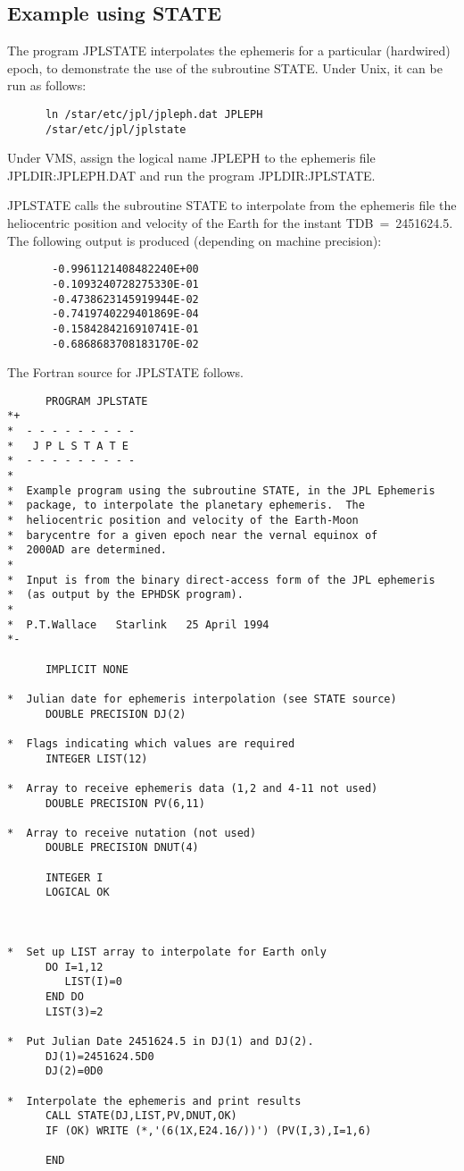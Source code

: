 \subsection{Example using STATE}
The program JPLSTATE interpolates the ephemeris for a
particular (hardwired) epoch, to demonstrate
the use of the subroutine STATE.  Under Unix, it can be run as
follows:
\begin{verbatim}
      ln /star/etc/jpl/jpleph.dat JPLEPH
      /star/etc/jpl/jplstate
\end{verbatim}
Under VMS, assign the logical name JPLEPH to the
ephemeris file JPLDIR:JPLEPH.DAT
and run the program JPLDIR:JPLSTATE.

JPLSTATE calls the subroutine STATE to interpolate from the ephemeris file the
heliocentric position and velocity of the Earth for the instant
TDB~=~2451624.5. The following output is produced (depending on
machine precision):

\begin{verbatim}
       -0.9961121408482240E+00
       -0.1093240728275330E-01
       -0.4738623145919944E-02
       -0.7419740229401869E-04
       -0.1584284216910741E-01
       -0.6868683708183170E-02
\end{verbatim}
The Fortran source for JPLSTATE follows.

\begin{verbatim}
      PROGRAM JPLSTATE
*+
*  - - - - - - - - -
*   J P L S T A T E
*  - - - - - - - - -
*
*  Example program using the subroutine STATE, in the JPL Ephemeris
*  package, to interpolate the planetary ephemeris.  The
*  heliocentric position and velocity of the Earth-Moon
*  barycentre for a given epoch near the vernal equinox of
*  2000AD are determined.
*
*  Input is from the binary direct-access form of the JPL ephemeris
*  (as output by the EPHDSK program).
*
*  P.T.Wallace   Starlink   25 April 1994
*-

      IMPLICIT NONE

*  Julian date for ephemeris interpolation (see STATE source)
      DOUBLE PRECISION DJ(2)

*  Flags indicating which values are required
      INTEGER LIST(12)

*  Array to receive ephemeris data (1,2 and 4-11 not used)
      DOUBLE PRECISION PV(6,11)

*  Array to receive nutation (not used)
      DOUBLE PRECISION DNUT(4)

      INTEGER I
      LOGICAL OK



*  Set up LIST array to interpolate for Earth only
      DO I=1,12
         LIST(I)=0
      END DO
      LIST(3)=2

*  Put Julian Date 2451624.5 in DJ(1) and DJ(2).
      DJ(1)=2451624.5D0
      DJ(2)=0D0

*  Interpolate the ephemeris and print results
      CALL STATE(DJ,LIST,PV,DNUT,OK)
      IF (OK) WRITE (*,'(6(1X,E24.16/))') (PV(I,3),I=1,6)

      END
\end{verbatim}

